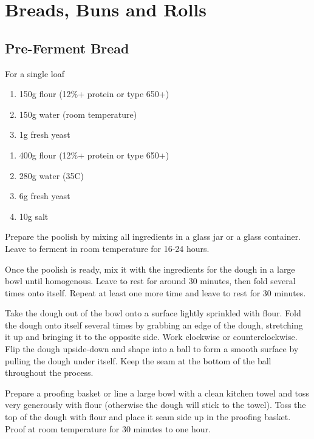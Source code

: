 \chapter{Breads, Buns and Rolls}
\section{Pre-Ferment Bread}

For a single loaf

\begin{enumerate}
  \item 150g flour (12\%+ protein or type 650+)
  \item 150g water (room temperature)
  \item 1g fresh yeast
\end{enumerate}

\begin{enumerate}
  \item 400g flour (12\%+ protein or type 650+)
  \item 280g water (35C)
  \item 6g fresh yeast
  \item 10g salt
\end{enumerate}

Prepare the poolish by mixing all ingredients in a glass jar or a glass
container. Leave to ferment in room temperature for 16-24 hours.

Once the poolish is ready, mix it with the ingredients for the dough in a large
bowl until homogenous. Leave to rest for around 30 minutes, then fold several
times onto itself. Repeat at least one more time and leave to rest for 30
minutes.

Take the dough out of the bowl onto a surface lightly sprinkled with flour.
Fold the dough onto itself several times by grabbing an edge of the dough,
stretching it up and bringing it to the opposite side. Work clockwise or
counterclockwise. Flip the dough upside-down and shape into a ball to form a
smooth surface by pulling the dough under itself. Keep the seam at the bottom
of the ball throughout the process.

Prepare a proofing basket or line a large bowl with a clean kitchen towel and
toss very generously with flour (otherwise the dough will stick to the towel).
Toss the top of the dough with flour and place it seam side up in the proofing
basket. Proof at room temperature for 30 minutes to one hour.

